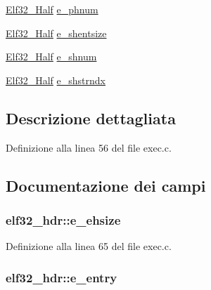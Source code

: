 \begin{DoxyCompactItemize}
\item 
\hyperlink{exec_8c_a2ff0787d7d1bae0f251192806a2974ca}{Elf32\+\_\+\+Half} \hyperlink{structelf32__hdr_ae97c82a1bab1e0bf6de2d4ad0f6eef79}{e\+\_\+phnum}
\item 
\hyperlink{exec_8c_a2ff0787d7d1bae0f251192806a2974ca}{Elf32\+\_\+\+Half} \hyperlink{structelf32__hdr_a8ca2eaada4cff245f41faa852a4a248e}{e\+\_\+shentsize}
\item 
\hyperlink{exec_8c_a2ff0787d7d1bae0f251192806a2974ca}{Elf32\+\_\+\+Half} \hyperlink{structelf32__hdr_ab7d153e79bf2dca73049268f1fcd79c6}{e\+\_\+shnum}
\item 
\hyperlink{exec_8c_a2ff0787d7d1bae0f251192806a2974ca}{Elf32\+\_\+\+Half} \hyperlink{structelf32__hdr_afd7ed18333923147918975fdfa4ee99a}{e\+\_\+shstrndx}
\end{DoxyCompactItemize}


\subsection{Descrizione dettagliata}


Definizione alla linea 56 del file exec.\+c.



\subsection{Documentazione dei campi}
\hypertarget{structelf32__hdr_a3d3364b74b882c7383f11a17ddda34b2}{
\subsubsection[{e\+\_\+ehsize}]{ elf32\+\_\+hdr\+::e\+\_\+ehsize}}\label{structelf32__hdr_a3d3364b74b882c7383f11a17ddda34b2}


Definizione alla linea 65 del file exec.\+c.

\hypertarget{structelf32__hdr_aebf266c7454956ac9aca091c837f6c14}{
\subsubsection[{e\+\_\+entry}]{ elf32\+\_\+hdr\+::e\+\_\+entry}}\label{structelf32__hdr_aebf266c7454956ac9aca091c837f6c14}


